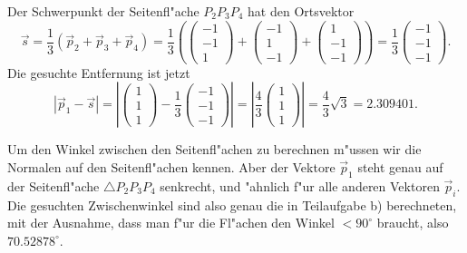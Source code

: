 \begin{loesung}
\begin{teilaufgaben}
\item
Der Schwerpunkt der Seitenfl"ache $P_2P_3P_4$ hat den Ortsvektor
\[
\vec s=\frac13(\vec p_2+\vec p_3+\vec p_4)
=
\frac13\left(
\begin{pmatrix}-1\\-1\\ 1\end{pmatrix}+
\begin{pmatrix}-1\\ 1\\-1\end{pmatrix}+
\begin{pmatrix} 1\\-1\\-1\end{pmatrix}
\right)
=\frac13
\begin{pmatrix} -1\\-1\\-1 \end{pmatrix}.
\]
Die gesuchte Entfernung ist jetzt
\[
|\vec p_1-\vec s|
=
\left|
\begin{pmatrix}1\\1\\1\end{pmatrix}
-
\frac13\begin{pmatrix} -1\\-1\\-1 \end{pmatrix}
\right|
=
\left|
\frac43\begin{pmatrix}1\\1\\1\end{pmatrix}
\right|
=\frac43\sqrt{3}=2.309401.
\]
\item
Um den Winkel zwischen den Seitenfl"achen zu berechnen m"ussen wir die 
Normalen auf den Seitenfl"achen kennen. Aber der Vektore $\vec p_1$ steht
genau auf der Seitenfl"ache $\triangle P_2P_3P_4$ senkrecht, und "ahnlich
f"ur alle anderen Vektoren $\vec p_i$. Die gesuchten Zwischenwinkel
sind also genau die in Teilaufgabe b) berechneten, mit der Ausnahme, dass
man f"ur die Fl"achen den Winkel $<90^\circ$ braucht, also $70.52878^\circ$.
\qedhere
\end{teilaufgaben}
\end{loesung}
